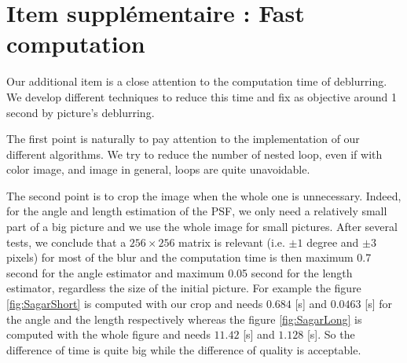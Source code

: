 \section{Item supplémentaire : Fast computation}

Our additional item is a close attention to the computation time of deblurring. 
We develop different techniques to reduce this time and fix as objective around 1 second by picture's deblurring.  

The first point is naturally to pay attention to the implementation of our different algorithms. We try to reduce the number of nested loop, even if with color image, and image in general, loops are quite unavoidable. 

The second point is to crop the image when the whole one is unnecessary. Indeed, for the angle and length estimation of the PSF, we only need a relatively small part of a big picture and we  use the whole image for small pictures. After several tests, we conclude that a $256 \times 256 $ matrix is relevant (i.e. $\pm 1$ degree and $\pm 3$ pixels) for most of the blur and the computation time is then maximum 0.7 second for the angle estimator and maximum 0.05 second for the length estimator, regardless the size of the initial picture. For example the figure \ref{fig:SagarShort} is computed with our crop and needs $0.684 $ [s] and $0.0463$ [s] for the angle and the length respectively whereas the figure \ref{fig:SagarLong} is computed with the whole figure and needs $11.42$ [s] and $1.128$ [s]. So the difference of time is quite big while the difference of quality is acceptable. 
